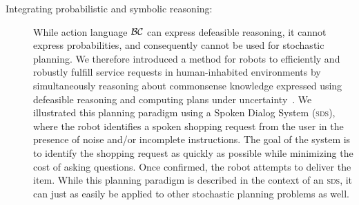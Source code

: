 \documentclass[runningheads,a4paper]{llncs}
\begin{document}
\begin{description}
\item[Integrating probabilistic and symbolic reasoning:] While action
language ${\cal BC}$ can express defeasible reasoning, it cannot
express probabilities, and consequently cannot be used for stochastic
planning.  We therefore introduced a method for robots to efficiently
and robustly fulfill service requests in human-inhabited environments
by simultaneously reasoning about commonsense knowledge expressed
using defeasible reasoning and computing plans under
uncertainty~\cite{zhang2015corpp}.  We illustrated this planning
paradigm using a Spoken Dialog System (\textsc{sds}), where the robot
identifies a spoken shopping request from the user in the presence of
noise and/or incomplete instructions.  The goal of the system is to
identify the shopping request as quickly as possible while minimizing
the cost of asking questions.  Once confirmed, the robot attempts to
deliver the item.  While this planning paradigm is described in the
context of an \textsc{sds}, it can just as easily be applied to other
stochastic planning problems as well.

%




\end{description}
\end{document}

